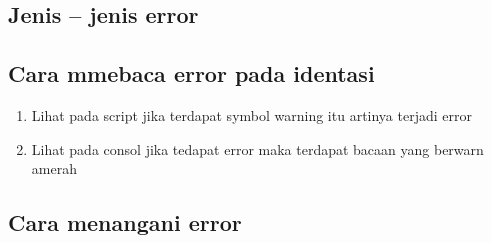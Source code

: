\documentclass{article}
\begin{document}
\begin{enumerate}
\subsection{Jenis – jenis error  }
\usepackage{Identasi ini bisa terjadi  ketika salah memberi identasi oleh karena itu identasi dijadikan sebagai penanda blok.}
\subsection{	Cara mmebaca error pada identasi}
\begin{enumerate}
    \item Lihat pada script jika terdapat symbol warning itu artinya terjadi error
\item	Lihat pada consol jika tedapat error maka terdapat bacaan yang berwarn amerah
\end{enumerate}

\subsection{Cara menangani error}	
 \usepackage{ Caranya adalah tanda warning atau error pada console kalian lihat , lalu cari kesalahannya serta solusi untuk error tersebut.s} 
 \end{enumerate}
                         
 
\end{document}
